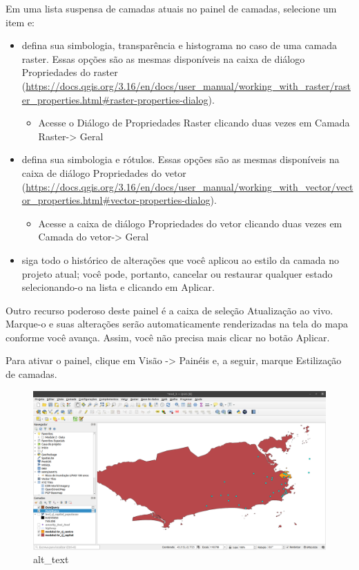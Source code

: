 \documentclass[
  portuguese,
]{krantz}
\providecommand{\tightlist}{%
  \setlength{\itemsep}{0pt}\setlength{\parskip}{0pt}}
\begin{document}
Em uma lista suspensa de camadas atuais no painel de camadas, selecione um item e:

\begin{itemize}
\tightlist
\item
  defina sua simbologia, transparência e histograma no caso de uma camada raster. Essas opções são as mesmas disponíveis na caixa de diálogo Propriedades do raster (\url{https://docs.qgis.org/3.16/en/docs/user_manual/working_with_raster/raster_properties.html\#raster-properties-dialog}).

  \begin{itemize}
  \tightlist
  \item
    Acesse o Diálogo de Propriedades Raster clicando duas vezes em Camada Raster-\textgreater{} Geral
  \end{itemize}
\item
  defina sua simbologia e rótulos. Essas opções são as mesmas disponíveis na caixa de diálogo Propriedades do vetor (\href{https://docs.\%20qgis.org/3.16/en/docs/user_manual/working_with_vector/vector_properties.html\#vector-properties-dialog}{https://docs.qgis.org/3.16/en/docs/user\_manual/working\_with\_vector/vector\_properties.html\#vector-properties-dialog}).

  \begin{itemize}
  \tightlist
  \item
    Acesse a caixa de diálogo Propriedades do vetor clicando duas vezes em Camada do vetor-\textgreater{} Geral
  \end{itemize}
\item
  siga todo o histórico de alterações que você aplicou ao estilo da camada no projeto atual; você pode, portanto, cancelar ou restaurar qualquer estado selecionando-o na lista e clicando em Aplicar.
\end{itemize}

Outro recurso poderoso deste painel é a caixa de seleção Atualização ao vivo. Marque-o e suas alterações serão automaticamente renderizadas na tela do mapa conforme você avança. Assim, você não precisa mais clicar no botão Aplicar.

Para ativar o painel, clique em Visão -\textgreater{} Painéis e, a seguir, marque Estilização de camadas.

\begin{figure}
\centering
\includegraphics{media/modulo4/layer-styling.png}
\caption{alt\_text}
\end{figure}
\end{document}
